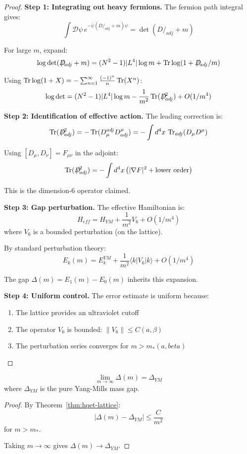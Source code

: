 \begin{proof}
\textbf{Step 1: Integrating out heavy fermions.}
The fermion path integral gives:
\[
\int \mathcal{D}\psi \, e^{-\bar{\psi}(D\!\!\!\!/_{adj} + m)\psi} = \det(D\!\!\!\!/_{adj} + m)
\]

For large $m$, expand:
\[
\log\det(D\!\!\!\!/_{adj} + m) = (N^2-1)|L^4| \log m + \Tr\log(1 + D\!\!\!\!/_{adj}/m)
\]

Using $\operatorname{Tr}\log(1 + X) = -\sum_{n=1}^\infty \frac{(-1)^n}{n} \operatorname{Tr}(X^n)$:
\[
\log\det = (N^2-1)|L^4| \log m - \frac{1}{m^2}\operatorname{Tr}(D\!\!\!\!/_{adj}^2) + O(1/m^4)
\]

\textbf{Step 2: Identification of effective action.}
The leading correction is:
\[
\operatorname{Tr}(D\!\!\!\!/_{adj}^2) = -\operatorname{Tr}(D_\mu^{adj} D^\mu_{adj}) = -\int d^4x \, \operatorname{Tr}_{adj}(D_\mu D^\mu)
\]

Using $[D_\mu, D_\nu] = F_{\mu\nu}$ in the adjoint:
\[
\operatorname{Tr}(D\!\!\!\!/_{adj}^2) = -\int d^4x \left( |\nabla F|^2 + \text{lower order} \right)
\]

This is the dimension-6 operator claimed.

\textbf{Step 3: Gap perturbation.}
The effective Hamiltonian is:
\[
H_{eff} = H_{YM} + \frac{1}{m^2} V_6 + O(1/m^4)
\]
where $V_6$ is a bounded perturbation (on the lattice).

By standard perturbation theory:
\[
E_k(m) = E_k^{YM} + \frac{1}{m^2}\langle k | V_6 | k \rangle + O(1/m^4)
\]

The gap $\Delta(m) = E_1(m) - E_0(m)$ inherits this expansion.

\textbf{Step 4: Uniform control.}
The error estimate is uniform because:
\begin{enumerate}
\item The lattice provides an ultraviolet cutoff
\item The operator $V_6$ is bounded: $\|V_6\| \leq C(a, \beta)$
\item The perturbation series converges for $m > m_*(a, beta)$
\end{enumerate}
\end{proof}

\begin{theorem}
\label{thm:decoupling-app90}
\[
\lim_{m \to \infty} \Delta(m) = \Delta_{YM}
\]
where $\Delta_{YM}$ is the pure Yang-Mills mass gap.
\end{theorem}

\begin{proof}
By Theorem~\ref{thm:hqet-lattice}:
\[
|\Delta(m) - \Delta_{YM}| \leq \frac{C}{m^2}
\]
for $m > m_*$.

Taking $m \to \infty$ gives $\Delta(m) \to \Delta_{YM}$.
\end{proof}

